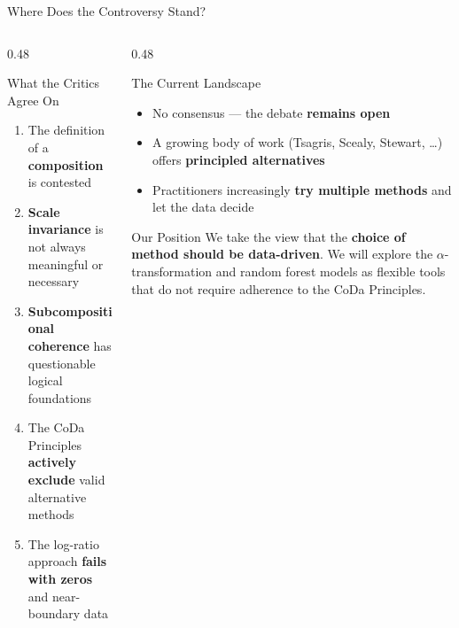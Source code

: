 \begin{frame}{Where Does the Controversy Stand?}

\begin{columns}[T]
  \begin{column}{0.48\textwidth}
    \begin{block}{What the Critics Agree On}
      \begin{enumerate}
        \item The definition of a \textbf{composition} is contested
        \item \textbf{Scale invariance} is not always meaningful or
              necessary
        \item \textbf{Subcompositional coherence} has questionable
              logical foundations
        \item The CoDa Principles \textbf{actively exclude} valid
              alternative methods
        \item The log-ratio approach \textbf{fails with zeros} and
              near-boundary data
      \end{enumerate}
    \end{block}
  \end{column}

  \begin{column}{0.48\textwidth}
    \begin{block}{The Current Landscape}
      \begin{itemize}
        \item No consensus — the debate \textbf{remains open}
        \item A growing body of work (Tsagris, Scealy, Stewart,
              \ldots) offers \textbf{principled alternatives}
        \item Practitioners increasingly \textbf{try multiple
              methods} and let the data decide
      \end{itemize}
    \end{block}

    \vspace{0.3cm}
    \begin{alertblock}{Our Position}
      We take the view that the \textbf{choice of method should
      be data-driven}. We will explore the $\alpha$-transformation
      and random forest models as flexible tools that do not
      require adherence to the CoDa Principles.
    \end{alertblock}
  \end{column}
\end{columns}

\end{frame}

